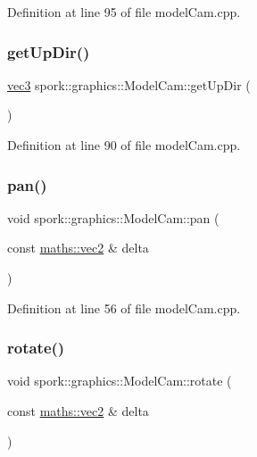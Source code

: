 Definition at line 95 of file model\+Cam.\+cpp.

\mbox{\label{classspork_1_1graphics_1_1_model_cam_ab5384be317526c2839bc736f6c779bd0}} 
\subsubsection{\texorpdfstring{get\+Up\+Dir()}{getUpDir()}}
{\footnotesize\ttfamily \hyperlink{structspork_1_1maths_1_1vec3}{vec3} spork\+::graphics\+::\+Model\+Cam\+::get\+Up\+Dir (\begin{DoxyParamCaption}{ }\end{DoxyParamCaption})}



Definition at line 90 of file model\+Cam.\+cpp.

\mbox{\label{classspork_1_1graphics_1_1_model_cam_a65f1646db38f6b616c34ddcb9d83b83b}} 
\subsubsection{\texorpdfstring{pan()}{pan()}}
{\footnotesize\ttfamily void spork\+::graphics\+::\+Model\+Cam\+::pan (\begin{DoxyParamCaption}\item[{const \hyperlink{structspork_1_1maths_1_1vec2}{maths\+::vec2} \&}]{delta }\end{DoxyParamCaption})\hspace{0.3cm}{\ttfamily [private]}}



Definition at line 56 of file model\+Cam.\+cpp.

\mbox{\label{classspork_1_1graphics_1_1_model_cam_a5d8bb1b2b47c2dff072b1033ab282d3e}} 
\subsubsection{\texorpdfstring{rotate()}{rotate()}}
{\footnotesize\ttfamily void spork\+::graphics\+::\+Model\+Cam\+::rotate (\begin{DoxyParamCaption}\item[{const \hyperlink{structspork_1_1maths_1_1vec2}{maths\+::vec2} \&}]{delta }\end{DoxyParamCaption})\hspace{0.3cm}{\ttfamily [private]}}



